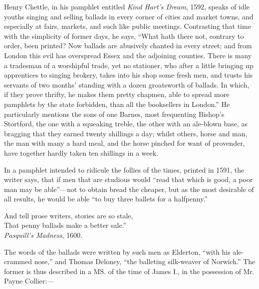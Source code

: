 Henry Chettle, in his pamphlet entitled \textit{Kind Hart’s Dream}, 1592, speaks of
idle youths singing and selling ballads in every corner of cities and market towns,
and especially at fairs, markets, and such like public meetings. Contrasting that
time with the simplicity of former days, he says, “What hath there not, contrary
to order, been printed? Now ballads are abusively chanted in every street; and
from London this evil has overspread Essex and the adjoining counties. There is
many a tradesman of a worshipful trade, yet no stationer, who after a little bringing
up apprentices to singing brokery, takes into his shop some fresh men, and
trusts his servants of two months’ standing with a dozen groatsworth of ballads.
In which, if they prove thrifty, he makes them pretty chapmen, able to spread
more pamphlets by the state forbidden, than all the booksellers in London.”
He particularly mentions the sons of one Barnes, most frequenting Bishop’s
Stortford, the one with a squeaking treble, the other with an ale-blown base, as
bragging that they earned twenty shillings a day; whilst others, horse and man,
the man with many a hard meal, and the horse pinched for want of provender,
have together hardly taken ten shillings in a week.

In a pamphlet intended to ridicule the follies of the times, printed in 1591, the
writer says, that if men that are studious would “read that which is good, a poor
man may be able”—not to obtain bread the cheaper, but as the most desirable of
all results, he would be able “to buy three ballets for a halfpenny.”

\settowidth{\versewidth}{And tell prose writers, stories are so stale}
\begin{scverse}
And tell prose writers, stories are so stale,\\
That penny ballads make a better sale.”\\
\vin\vin\vin\vin\vin\vin\textit{Pasquill’s Madness}, 1600.
\end{scverse}

The words of the ballads were written by such men as Elderton, “with his ale-crammed 
nose,” and Thomas Deloney, “the balleting silk-weaver of Norwich.”
The former is thus described in a MS. of the time of James I., in the possession
of Mr. Payne Collier:—

